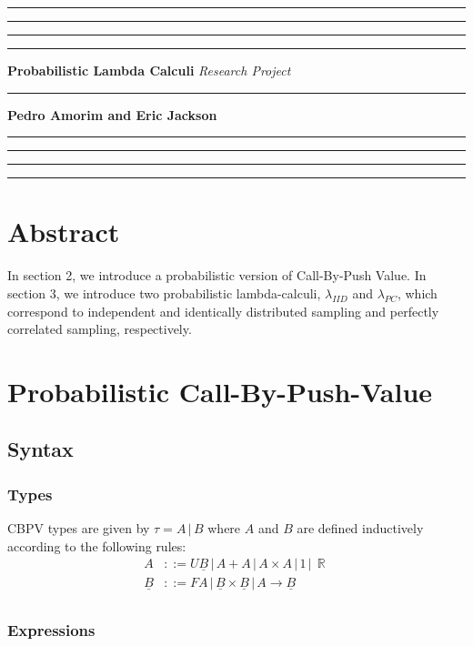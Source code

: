 \documentclass{article}
\DeclareMathOperator*\R{\mathbb{R}}
\begin{document}
	\hrule
	\smallskip
	\hrule\hrule\hrule
	\medskip
	\noindent
	{\huge \bf Probabilistic Lambda Calculi}
	\medskip
	\newline
	{\huge \it Research Project}

	\hrule
	\medskip
	\noindent
	{\Large \bf Pedro Amorim and Eric Jackson}
	\medskip
	\hrule\hrule\hrule
	\smallskip
	\hrule

\section{Abstract}

In section 2, we introduce a probabilistic version of Call-By-Push Value.
In section 3, we introduce two probabilistic lambda-calculi,
$\lambda_{IID}$ and $\lambda_{PC}$, which correspond to 
independent and identically distributed sampling 
and perfectly correlated sampling, respectively.

\section{Probabilistic Call-By-Push-Value}
\subsection{Syntax}
\subsubsection*{Types}
	CBPV types are given by $\tau = A \,|\, B$
	where $A$ and $B$ are defined inductively according to the following rules:
	\begin{equation*}
		\begin{split}
			A &::= 
			U \underline{B} 
			\,|\, A + A
			\,|\, A \times A
			\,|\, 1			
			\,|\, \R \\
			\underline{B} &::=
			F A
			\,|\, \underline{B} \times \underline{B}
			\,|\, A \to \underline{B} \\
		\end{split}
	\end{equation*}
	
\subsubsection*{Expressions}
	\begin{equation*}
	\end{equation*}
\end{document}
